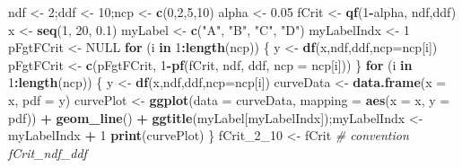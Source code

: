 \documentclass[]{book}
\newenvironment{Shaded}{\begin{snugshade}}{\end{snugshade}}
\newcommand{\CommentTok}[1]{\textcolor[rgb]{0.56,0.35,0.01}{\textit{#1}}}
\newcommand{\ControlFlowTok}[1]{\textcolor[rgb]{0.13,0.29,0.53}{\textbf{#1}}}
\newcommand{\DataTypeTok}[1]{\textcolor[rgb]{0.13,0.29,0.53}{#1}}
\newcommand{\DecValTok}[1]{\textcolor[rgb]{0.00,0.00,0.81}{#1}}
\newcommand{\FloatTok}[1]{\textcolor[rgb]{0.00,0.00,0.81}{#1}}
\newcommand{\KeywordTok}[1]{\textcolor[rgb]{0.13,0.29,0.53}{\textbf{#1}}}
\newcommand{\NormalTok}[1]{#1}
\newcommand{\OperatorTok}[1]{\textcolor[rgb]{0.81,0.36,0.00}{\textbf{#1}}}
\newcommand{\OtherTok}[1]{\textcolor[rgb]{0.56,0.35,0.01}{#1}}
\newcommand{\StringTok}[1]{\textcolor[rgb]{0.31,0.60,0.02}{#1}}
\begin{document}
\begin{Shaded}
\begin{Highlighting}[]
\NormalTok{ndf <-}\StringTok{ }\DecValTok{2}\NormalTok{;ddf <-}\StringTok{ }\DecValTok{10}\NormalTok{;ncp <-}\StringTok{ }\KeywordTok{c}\NormalTok{(}\DecValTok{0}\NormalTok{,}\DecValTok{2}\NormalTok{,}\DecValTok{5}\NormalTok{,}\DecValTok{10}\NormalTok{)}
\NormalTok{alpha <-}\StringTok{ }\FloatTok{0.05}
\NormalTok{fCrit <-}\StringTok{ }\KeywordTok{qf}\NormalTok{(}\DecValTok{1}\OperatorTok{-}\NormalTok{alpha, ndf,ddf)}
\NormalTok{x <-}\StringTok{ }\KeywordTok{seq}\NormalTok{(}\DecValTok{1}\NormalTok{, }\DecValTok{20}\NormalTok{, }\FloatTok{0.1}\NormalTok{)}
\NormalTok{myLabel <-}\StringTok{ }\KeywordTok{c}\NormalTok{(}\StringTok{"A"}\NormalTok{, }\StringTok{"B"}\NormalTok{, }\StringTok{"C"}\NormalTok{, }\StringTok{"D"}\NormalTok{)}
\NormalTok{myLabelIndx <-}\StringTok{ }\DecValTok{1}
\NormalTok{pFgtFCrit <-}\StringTok{ }\OtherTok{NULL}
\ControlFlowTok{for}\NormalTok{ (i }\ControlFlowTok{in} \DecValTok{1}\OperatorTok{:}\KeywordTok{length}\NormalTok{(ncp))}
\NormalTok{\{}
\NormalTok{  y <-}\StringTok{ }\KeywordTok{df}\NormalTok{(x,ndf,ddf,}\DataTypeTok{ncp=}\NormalTok{ncp[i])}
\NormalTok{  pFgtFCrit <-}\StringTok{ }\KeywordTok{c}\NormalTok{(pFgtFCrit, }\DecValTok{1}\OperatorTok{-}\KeywordTok{pf}\NormalTok{(fCrit, ndf, ddf, }\DataTypeTok{ncp =}\NormalTok{ ncp[i]))}
\NormalTok{\}  }
\ControlFlowTok{for}\NormalTok{ (i }\ControlFlowTok{in} \DecValTok{1}\OperatorTok{:}\KeywordTok{length}\NormalTok{(ncp))}
\NormalTok{\{}
\NormalTok{  y <-}\StringTok{ }\KeywordTok{df}\NormalTok{(x,ndf,ddf,}\DataTypeTok{ncp=}\NormalTok{ncp[i])}
\NormalTok{  curveData <-}\StringTok{ }\KeywordTok{data.frame}\NormalTok{(}\DataTypeTok{x =}\NormalTok{ x, }\DataTypeTok{pdf =}\NormalTok{ y)}
\NormalTok{  curvePlot <-}\StringTok{ }\KeywordTok{ggplot}\NormalTok{(}\DataTypeTok{data =}\NormalTok{ curveData, }\DataTypeTok{mapping =} \KeywordTok{aes}\NormalTok{(}\DataTypeTok{x =}\NormalTok{ x, }\DataTypeTok{y =}\NormalTok{ pdf)) }\OperatorTok{+}\StringTok{ }
\StringTok{    }\KeywordTok{geom_line}\NormalTok{() }\OperatorTok{+}
\StringTok{    }\KeywordTok{ggtitle}\NormalTok{(myLabel[myLabelIndx]);myLabelIndx <-}\StringTok{ }\NormalTok{myLabelIndx }\OperatorTok{+}\StringTok{ }\DecValTok{1}
  \KeywordTok{print}\NormalTok{(curvePlot)}
\NormalTok{\}}
\NormalTok{fCrit_}\DecValTok{2}\NormalTok{_}\DecValTok{10}\NormalTok{ <-}\StringTok{ }\NormalTok{fCrit }\CommentTok{# convention fCrit_ndf_ddf}
\end{Highlighting}
\end{Shaded}
\end{document}

